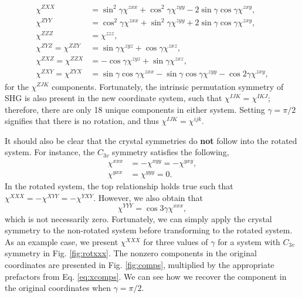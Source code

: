 \documentclass[aps,prb,10pt,letterpaper,notitlepage]{revtex4-1}
\begin{document}
\begin{equation*}
\begin{split}
\chi^{ZXX}
&=  \sin^{2}\gamma        \chi^{zxx}
 +  \cos^{2}\gamma        \chi^{zyy}
 - 2\sin\gamma \cos\gamma \chi^{zxy},\\[10pt]
\chi^{ZYY}
&=  \cos^{2}\gamma        \chi^{zxx}
 +  \sin^{2}\gamma        \chi^{zyy}
 + 2\sin\gamma \cos\gamma \chi^{zxy},\\[10pt]
\chi^{ZZZ} &=  \chi^{zzz},\\[10pt]
\chi^{ZYZ} = \chi^{ZZY}
&= \sin\gamma \chi^{zyz}
 + \cos\gamma \chi^{zxz},\\[10pt]
\chi^{ZXZ} = \chi^{ZZX}
&= 
- \cos\gamma \chi^{zyz}
+ \sin\gamma \chi^{zxz},\\[10pt]
\chi^{ZXY} = \chi^{ZYX}
&= \sin\gamma \cos\gamma \chi^{zxx}
 - \sin\gamma \cos\gamma \chi^{zyy}
 - \cos2\gamma         \chi^{zxy},
\end{split}
\end{equation*}
for the $\chi^{ZJK}$ components. Fortunately, the intrinsic permutation symmetry
of SHG is also present in the new coordinate system, such that $\chi^{IJK} =
\chi^{IKJ}$; therefore, there are only 18 unique components in either system.
Setting $\gamma = \pi/2$ signifies that there is no rotation, and thus
$\chi^{IJK} = \chi^{ijk}$.

It should also be clear that the crystal symmetries do \textbf{not} follow into
the rotated system. For instance, the $C_{3v}$ symmetry satisfies the following,
\begin{equation*}
\begin{split}
\chi^{xxx} &= -\chi^{xyy} = - \chi^{yxy},\\
\chi^{yxx} &= \chi^{yyy} = 0.
\end{split}
\end{equation*}
In the rotated system, the top relationship holds true such that $\chi^{XXX} =
-\chi^{XYY} = - \chi^{YXY}$. However, we also obtain that
\begin{equation*}
\chi^{YYY} = \cos3\gamma \chi^{xxx},
\end{equation*}
which is not necessarily zero. Fortunately, we can simply apply the crystal
symmetry to the non-rotated system before transforming to the rotated system. As
an example case, we present $\chi^{XXX}$ for three values of $\gamma$ for a
system with $C_{3v}$ symmetry in Fig. \ref{fig:rotxxx}. The nonzero components
in the original coordinates are presented in Fig. \ref{fig:comps}, multiplied by
the appropriate prefactors from Eq. \eqref{eq:xcomps}. We can see how we recover
the component in the original coordinates when $\gamma = \pi/2$.
\end{document}
